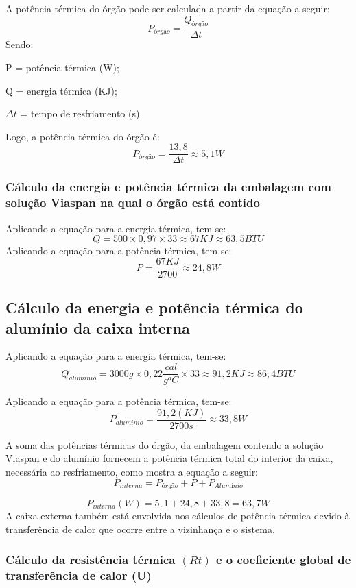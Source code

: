 	A potência térmica do órgão pode ser calculada a partir da equação a seguir:
	\begin{equation}
	P_{órgão} = \frac{Q_{órgão}}{\Delta t}
	\end{equation}
	Sendo:
	
	P = potência térmica (W);
	
	Q = energia térmica (KJ);
	
	$\Delta t$ = tempo de resfriamento (s)
	
	Logo, a potência térmica do órgão é:
	$$
	P_{órgão} = \frac{13,8}{\Delta t} \approx 5,1 W
	$$
	
	\subsubsection{Cálculo da energia e potência térmica da embalagem com solução Viaspan na qual o órgão está contido}
	Aplicando a equação para a energia térmica, tem-se:
	$$
	Q = 500  \times 0,97 \times 33 \approx 67 KJ \approx 63,5 BTU
	$$
	Aplicando a equação para a potência térmica, tem-se:
	$$
	P = \frac{67 KJ}{2700} \approx 24,8W
	$$
	
	\subsection{Cálculo da energia e potência térmica do alumínio da caixa interna}
	
	Aplicando a equação para a energia térmica, tem-se:
	$$
	Q_{aluminio} = 3000g \times 0,22\frac{cal}{g ^oC} \times 33 \approx 91,2 KJ \approx 86,4 BTU
	$$
	
	Aplicando a equação para a potência térmica, tem-se:
	$$
	P_{aluminio} = \frac{91,2 (KJ)}{2700 s} \approx 33,8 W
	$$
	
		A soma das potências térmicas do órgão, da embalagem contendo a solução Viaspan e do alumínio fornecem a potência térmica total do interior da caixa, necessária ao resfriamento, como mostra a equação a seguir:
		$$
		P_{interna} = P_{órgão}
 + P + P_{Alumínio}		$$
 
		 $$
		 P_{interna}(W) = 5,1+24,8+33,8 = 63,7 W
		 $$
		A caixa externa também está envolvida nos cálculos de potência térmica devido à transferência de calor que ocorre entre a vizinhança e o sistema.
		
		\subsubsection{Cálculo da resistência térmica $(Rt)$ e o coeficiente global de transferência de calor (U)}
		
